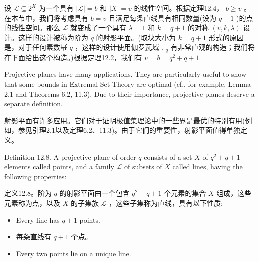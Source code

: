 \documentclass[10pt]{article}
\begin{document}
\begin{tcolorbox}\relax
设 \(\mathcal{L} \subseteq  {2}^{X}\) 为一个具有 \(\left| \mathcal{L}\right|  = b\) 和 \(\left| X\right|  = v\) 的线性空间。根据定理12.4， \(b \geq  v\) 。在本节中，我们将考虑具有 \(b = v\) 且满足每条直线具有相同数量(设为 \(q + 1\) )的点的线性空间。那么 \(\mathcal{L}\) 就变成了一个具有 \(\lambda  = 1\) 和 \(k = q + 1\) 的对称 \(\left( {v,k,\lambda }\right)\) 设计。这样的设计被称为阶为 \(q\) 的射影平面。(取块大小为 \(k = q + 1\) 形式的原因是，对于任何素数幂 \(q\) ，这样的设计使用伽罗瓦域 \({\mathbb{F}}_{q}\) 有非常直观的构造；我们将在下面给出这个构造。)根据定理12.2，我们有 \(v = b = {q}^{2} + q + 1.\)
\end{tcolorbox}

Projective planes have many applications. They are particularly useful to show that some bounds in Extremal Set Theory are optimal (cf., for example, Lemma 2.1 and Theorems 6.2, 11.3). Due to their importance, projective planes deserve a separate definition.

\begin{tcolorbox}\relax
射影平面有许多应用。它们对于证明极值集理论中的一些界是最优的特别有用(例如，参见引理2.1以及定理6.2、11.3)。由于它们的重要性，射影平面值得单独定义。
\end{tcolorbox}

Definition 12.8. A projective plane of order \(q\) consists of a set \(X\) of \({q}^{2} + q + 1\) elements called points, and a family \(\mathcal{L}\) of subsets of \(X\) called lines, having the following properties:

\begin{tcolorbox}\relax
定义12.8。阶为 \(q\) 的射影平面由一个包含 \({q}^{2} + q + 1\) 个元素的集合 \(X\) 组成，这些元素称为点，以及 \(X\) 的子集族 \(\mathcal{L}\) ，这些子集称为直线，具有以下性质:
\end{tcolorbox}

\begin{itemize}\relax
\item\relax Every line has \(q + 1\) points.
\end{itemize}

\begin{tcolorbox}\relax
\begin{itemize}\relax
\item\relax 每条直线有 \(q + 1\) 个点。
\end{itemize}
\end{tcolorbox}

\begin{itemize}\relax
\item\relax Every two points lie on a unique line.
\end{itemize}
\end{document}
